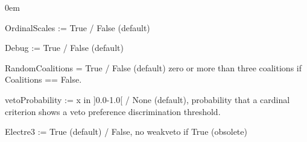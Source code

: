 \documentclass[letterpaper,10pt,english]{sphinxmanual}
\begin{document}
\begin{fulllineitems}
\begin{description}
\begin{DUlineblock}{0em}
\item[] OrdinalScales := True / False (default)
\item[] Debug := True / False (default)
\item[] RandomCoalitions = True / False (default) zero or more than three coalitions if Coalitions == False.
\item[] vetoProbability := x in {]}0.0-1.0{[} / None (default), probability that a cardinal criterion shows a veto preference discrimination threshold.
\item[] Electre3 := True (default) / False, no weakveto if True (obsolete)
\end{DUlineblock}

\end{description}

\end{fulllineitems}

\end{document}
